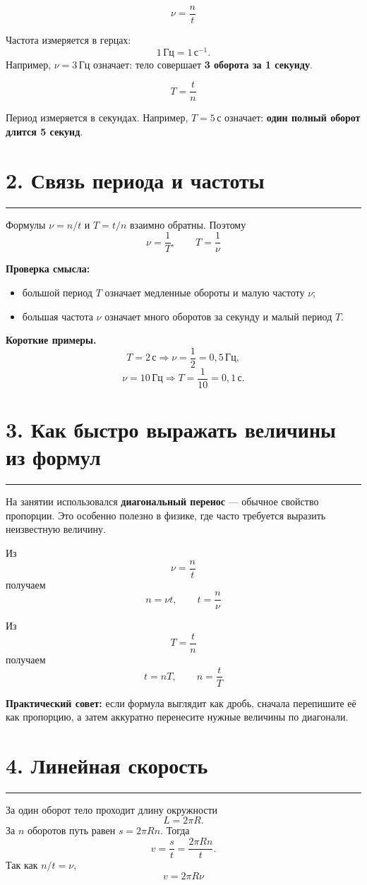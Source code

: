 \documentclass[a4paper,12pt]{article}
\newcommand{\sectionrule}{\par\vspace{0.25em}\noindent\color{accent}\rule{\linewidth}{0.55pt}\color{textgray}\par\vspace{0.25em}}
\newcommand{\key}[1]{\textbf{\color{darkaccent}#1}}
\newcommand{\formula}[1]{\[\boxed{#1}\]}
\newcommand{\Hz}{\,\text{Гц}}
\newcommand{\secnd}{\,\text{с}}
\begin{document}
\formula{\nu=\frac{n}{t}}

Частота измеряется в герцах:
\[
1\Hz=1\,\text{с}^{-1}.
\]
Например, $\nu=3\Hz$ означает: тело совершает \key{3 оборота за 1 секунду}.

\formula{T=\frac{t}{n}}

Период измеряется в секундах. Например, $T=5\secnd$ означает: \key{один полный оборот длится 5 секунд}.

\section*{2. Связь периода и частоты}
\sectionrule

Формулы $\nu=n/t$ и $T=t/n$ взаимно обратны. Поэтому
\formula{\nu=\frac{1}{T},\qquad T=\frac{1}{\nu}}

\key{Проверка смысла:}
\begin{itemize}
  \item большой период $T$ означает медленные обороты и малую частоту $\nu$;
  \item большая частота $\nu$ означает много оборотов за секунду и малый период $T$.
\end{itemize}

\textbf{Короткие примеры.}
\[
T=2\secnd \Rightarrow \nu=\frac12=0{,}5\Hz,
\]
\[
\nu=10\Hz \Rightarrow T=\frac1{10}=0{,}1\secnd.
\]

\section*{3. Как быстро выражать величины из формул}
\sectionrule

На занятии использовался \key{диагональный перенос} — обычное свойство пропорции. Это особенно полезно в физике, где часто требуется выразить неизвестную величину.

Из
\[
\nu=\frac{n}{t}
\]
получаем
\formula{n=\nu t,\qquad t=\frac{n}{\nu}}

Из
\[
T=\frac{t}{n}
\]
получаем
\formula{t=nT,\qquad n=\frac{t}{T}}

\key{Практический совет:} если формула выглядит как дробь, сначала перепишите её как пропорцию, а затем аккуратно перенесите нужные величины по диагонали.

\clearpage
\section*{4. Линейная скорость}
\sectionrule

За один оборот тело проходит длину окружности
\[
L=2\pi R.
\]
За $n$ оборотов путь равен $s=2\pi Rn$. Тогда
\[
v=\frac{s}{t}=\frac{2\pi Rn}{t}.
\]
Так как $n/t=\nu$,
\formula{v=2\pi R\nu}
\end{document}
